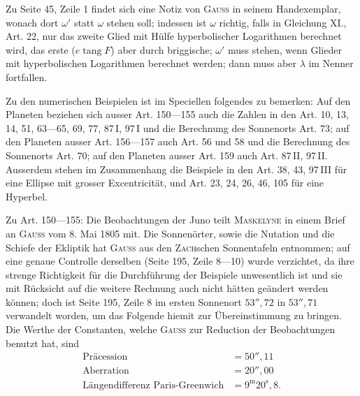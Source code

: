 \hypertarget{native-291-remarks}{}
Zu Seite 45, Zeile 1 findet sich eine Notiz von \textsc{Gauss} in seinem Handexemplar,
wonach dort $\omega'$ statt $\omega$ stehen soll; indessen ist $\omega$ richtig, falls in
Gleichung XI., Art. 22, nur das zweite Glied mit Hülfe hyperbolischer Logarithmen berechnet
wird, das erste ($e\operatorname{tang} F$) aber durch briggische; $\omega'$ muss stehen,  wenn 
Glieder mit hyperbolischen Logarithmen berechnet werden; dann muss aber $\lambda$ im
Nenner fortfallen.

Zu den numerischen Beispielen ist im Speciellen folgendes zu bemerken: Auf den Planeten
 beziehen sich ausser Art. 150---155 auch die Zahlen in den Art. 10, 13, 14, 51,
63---65, 69, 77, 87\,I, 97\,I und die Berechnung des Sonnenorts Art. 73; auf den Planeten
 ausser Art. 156---157 auch Art. 56 und 58 und die Berechnung des Sonnenorts
Art. 70; auf den Planeten  ausser Art. 159 auch Art. 87\,II, 97\,II. Ausserdem stehen
im Zusammenhang die Beispiele in den Art. 38, 43, 97\,III für eine Ellipse mit grosser
Excentricität, und Art. 23, 24, 26, 46, 105 für eine Hyperbel.

Zu Art. 150---155: Die Beobachtungen der Juno teilt \textsc{Maskelyne} in einem Brief an
\textsc{Gauss} vom 8. Mai 1805 mit. Die Sonnenörter, sowie die Nutation und die Schiefe der
Ekliptik hat \textsc{Gauss} aus den \textsc{Zach}schen Sonnentafeln entnommen; auf eine
genaue Controlle derselben (Seite 195, Zeile 8---10) wurde verzichtet, da ihre strenge
Richtigkeit für die Durchführung der Beispiele unwesentlich ist und sie mit Rücksicht auf
die weitere Rechnung auch nicht hätten geändert werden können; doch ist Seite 195, Zeile 8
im ersten Sonnenort $53''{,}72$ in $53''{,}71$ verwandelt worden, um das Folgende hiemit zur
Übereinstimmung zu bringen. Die Werthe der Constanten, welche \textsc{Gauss} zur Reduction
der Beobachtungen benutzt hat, sind
\[
\begin{aligned}
\text{Präcession}&=50''{,}11\\
\text{Aberration}&=20''{,}00\\
\text{Längendifferenz Paris-Greenwich}&=9^{\mathrm m}20^{\mathrm s}{,}8.
\end{aligned}
\]

